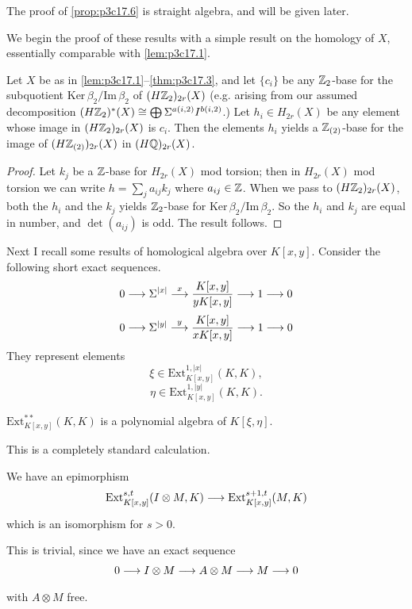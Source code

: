 \documentclass[../main]{subfiles}
\begin{document}
The proof of \ref{prop:p3c17.6} is straight algebra, and will be given later.

We begin the proof of these results with a simple result on the homology of $X$, essentially comparable with \ref{lem:p3c17.1}. 

\begin{lemma}
\label{lem:p3c17.7}
Let $X$ be as in \ref{lem:p3c17.1}--\ref{thm:p3c17.3}, and let $\{c_i\}$ be any $\mathbb{Z}_2$-base for the subquotient $\mathrm{Ker} \, \beta_2/\mathrm{Im} \, \beta_2$ of $(H\mathbb{Z}_2)_{2r}(X)$ (e.g. arising from our assumed decomposition $(H \mathbb{Z}_2)^\ast(X) \cong \bigoplus \Sigma^{a(i, 2)} I^{b(i, 2)}$.) Let $h_i \in H_{2r}(X)$ be any element whose image in $(H \mathbb{Z}_2)_{2r}(X)$ is $c_i$. Then the elements $h_i$ yields a $\mathbb{Z}_{(2)}$-base for the image of $(H \mathbb{Z}_{(2)})_{2r}(X)$ in $(H \mathbb{Q})_{2r}(X)$.
\end{lemma}

\begin{proof}
Let $k_j$ be a $\mathbb{Z}$-base for $H_{2r}(X)$ mod torsion; then in $H_{2r}(X)$ mod torsion we can write $\displaystyle h = \sum_j a_{ij} k_j$ where $a_{ij} \in \mathbb{Z}$. When we pass to $(H \mathbb{Z}_2)_{2r}(X)$, both the $h_i$ and the $k_j$ yields $\mathbb{Z}_2$-base for $\mathrm{Ker} \, \beta_2/\mathrm{Im} \, \beta_2$. So the $h_i$ and $k_j$ are equal in number, and $\det(a_{ij})$ is odd. The result follows.
\end{proof}

Next I recall some results of homological algebra over $K[x, y]$. Consider the following short exact sequences. \[0 \lar{} \Sigma^{|x|} \lar{x} \frac {K[x, y]} {y K[x, y]} \lar{} 1 \lar{} 0\] \[0 \lar{} \Sigma^{|y|} \lar{y} \frac {K[x, y]} {x K[x, y]} \lar{} 1 \lar{} 0\] They represent elements \[\xi \in \mathrm{Ext}_{K[x, y]}^{1, |x|} (K, K),\] \[\eta \in \mathrm{Ext}_{K[x, y]}^{1, |y|} (K, K).\]

\begin{lemma}
\label{lem:p3c17.8}
$\mathrm{Ext}_{K[x, y]}^{\ast \ast}(K, K)$ is a polynomial algebra of $K[\xi, \eta]$.
\end{lemma}

This is a completely standard calculation.

\begin{lemma}
\label{lem:p3c17.9}
We have an epimorphism \[\mathrm{Ext}_{K[x,y]}^{s,t}(I\otimes M,K)\lar{}\mathrm{Ext}_{K[x,y]}^{s+1,t}(M,K)\] which is an isomorphism for $s>0$.
\end{lemma}

This is trivial, since we have an exact sequence \[0 \lar{} I \otimes M \lar{} A \otimes M \lar{} M \lar{} 0\] with $A \otimes M$ free.
\end{document}
